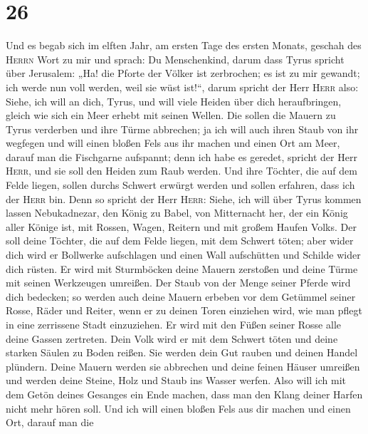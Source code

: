 \hypertarget{section-25}{%
\section{26}\label{section-25}}

 Und es begab sich im elften Jahr, am ersten Tage des
ersten Monats, geschah des \textsc{Herrn} Wort zu mir und sprach:
 Du Menschenkind, darum dass Tyrus spricht über Jerusalem:
„Ha! die Pforte der Völker ist zerbrochen; es ist zu mir gewandt; ich
werde nun voll werden, weil sie wüst ist!{}``,  darum
spricht der Herr \textsc{Herr} also: Siehe, ich will an dich, Tyrus, und
will viele Heiden über dich heraufbringen, gleich wie sich ein Meer
erhebt mit seinen Wellen.  Die sollen die Mauern zu Tyrus
verderben und ihre Türme abbrechen; ja ich will auch ihren Staub von ihr
wegfegen und will einen bloßen Fels aus ihr machen  und
einen Ort am Meer, darauf man die Fischgarne aufspannt; denn ich habe es
geredet, spricht der Herr \textsc{Herr}, und sie soll den Heiden zum
Raub werden.  Und ihre Töchter, die auf dem Felde liegen,
sollen durchs Schwert erwürgt werden und sollen erfahren, dass ich der
\textsc{Herr} bin.  Denn so spricht der Herr
\textsc{Herr}: Siehe, ich will über Tyrus kommen lassen Nebukadnezar,
den König zu Babel, von Mitternacht her, der ein König aller Könige ist,
mit Rossen, Wagen, Reitern und mit großem Haufen Volks. 
Der soll deine Töchter, die auf dem Felde liegen, mit dem Schwert töten;
aber wider dich wird er Bollwerke aufschlagen und einen Wall aufschütten
und Schilde wider dich rüsten.  Er wird mit Sturmböcken
deine Mauern zerstoßen und deine Türme mit seinen Werkzeugen umreißen.
 Der Staub von der Menge seiner Pferde wird dich
bedecken; so werden auch deine Mauern erbeben vor dem Getümmel seiner
Rosse, Räder und Reiter, wenn er zu deinen Toren einziehen wird, wie man
pflegt in eine zerrissene Stadt einzuziehen.  Er wird mit
den Füßen seiner Rosse alle deine Gassen zertreten. Dein Volk wird er
mit dem Schwert töten und deine starken Säulen zu Boden reißen.
 Sie werden dein Gut rauben und deinen Handel plündern.
Deine Mauern werden sie abbrechen und deine feinen Häuser umreißen und
werden deine Steine, Holz und Staub ins Wasser werfen. 
Also will ich mit dem Getön deines Gesanges ein Ende machen, dass man
den Klang deiner Harfen nicht mehr hören soll.  Und ich
will einen bloßen Fels aus dir machen und einen Ort, darauf man die
